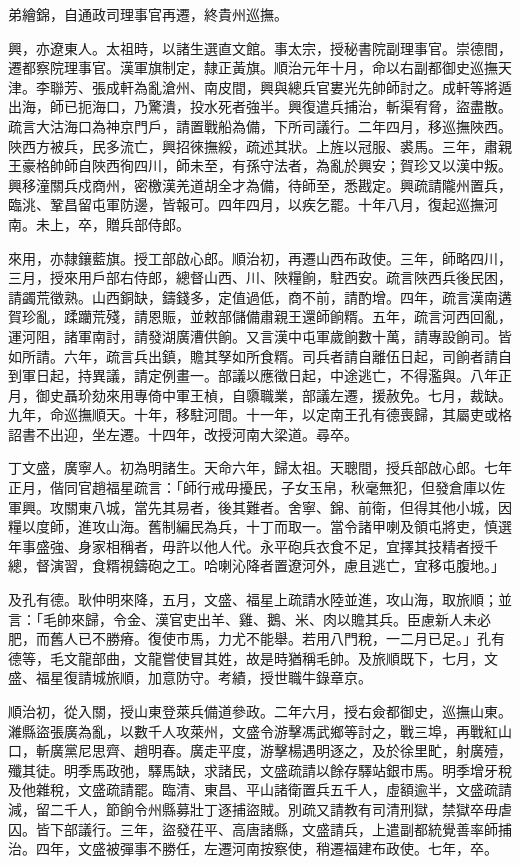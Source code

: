 \begin{pinyinscope}
弟繪錦，自通政司理事官再遷，終貴州巡撫。

興，亦遼東人。太祖時，以諸生選直文館。事太宗，授秘書院副理事官。崇德間，遷都察院理事官。漢軍旗制定，隸正黃旗。順治元年十月，命以右副都御史巡撫天津。李聯芳、張成軒為亂滄州、南皮間，興與總兵官婁光先帥師討之。成軒等將遁出海，師已扼海口，乃驚潰，投水死者強半。興復遣兵捕治，斬渠宥脅，盜盡散。疏言大沽海口為神京門戶，請置戰船為備，下所司議行。二年四月，移巡撫陜西。陜西方被兵，民多流亡，興招徠撫綏，疏述其狀。上旌以冠服、裘馬。三年，肅親王豪格帥師自陜西徇四川，師未至，有孫守法者，為亂於興安；賀珍又以漢中叛。興移潼關兵戍商州，密檄漢羌道胡全才為備，待師至，悉戡定。興疏請隴州置兵，臨洮、鞏昌留屯軍防邊，皆報可。四年四月，以疾乞罷。十年八月，復起巡撫河南。未上，卒，贈兵部侍郎。

來用，亦隸鑲藍旗。授工部啟心郎。順治初，再遷山西布政使。三年，師略四川，三月，授來用戶部右侍郎，總督山西、川、陜糧餉，駐西安。疏言陜西兵後民困，請蠲荒徵熟。山西銅缺，鑄錢多，定值過低，商不前，請酌增。四年，疏言漢南遘賀珍亂，蹂躪荒殘，請恩賑，並敕部儲備肅親王還師餉糈。五年，疏言河西回亂，運河阻，諸軍南討，請發湖廣漕供餉。又言漢中屯軍歲餉數十萬，請專設餉司。皆如所請。六年，疏言兵出鎮，贍其孥如所食糈。司兵者請自離伍日起，司餉者請自到軍日起，持異議，請定例畫一。部議以應徵日起，中途逃亡，不得濫與。八年正月，御史聶玠劾來用專倚中軍王楨，自隳職業，部議左遷，援赦免。七月，裁缺。九年，命巡撫順天。十年，移駐河間。十一年，以定南王孔有德喪歸，其屬吏或格詔書不出迎，坐左遷。十四年，改授河南大梁道。尋卒。

丁文盛，廣寧人。初為明諸生。天命六年，歸太祖。天聰間，授兵部啟心郎。七年正月，偕同官趙福星疏言：「師行戒毋擾民，子女玉帛，秋毫無犯，但發倉庫以佐軍興。攻關東八城，當先其易者，後其難者。舍寧、錦、前衛，但得其他小城，因糧以度師，進攻山海。舊制編民為兵，十丁而取一。當令諸甲喇及領屯將吏，慎選年事盛強、身家相稱者，毋許以他人代。永平砲兵衣食不足，宜擇其技精者授千總，督演習，食糈視鑄砲之工。哈喇沁降者置遼河外，慮且逃亡，宜移屯腹地。」

及孔有德。耿仲明來降，五月，文盛、福星上疏請水陸並進，攻山海，取旅順；並言：「毛帥來歸，令金、漢官吏出羊、雞、鵝、米、肉以贍其兵。臣慮新人未必肥，而舊人已不勝瘠。復使市馬，力尤不能舉。若用八門稅，一二月已足。」孔有德等，毛文龍部曲，文龍嘗使冒其姓，故是時猶稱毛帥。及旅順既下，七月，文盛、福星復請城旅順，加意防守。考績，授世職牛錄章京。

順治初，從入關，授山東登萊兵備道參政。二年六月，授右僉都御史，巡撫山東。濰縣盜張廣為亂，以數千人攻萊州，文盛令游擊馮武鄉等討之，戰三埠，再戰紅山口，斬廣黨尼思齊、趙明春。廣走平度，游擊楊遇明逐之，及於徐里甿，射廣殪，殲其徒。明季馬政弛，驛馬缺，求諸民，文盛疏請以餘存驛站銀市馬。明季增牙稅及他雜稅，文盛疏請罷。臨清、東昌、平山諸衛置兵五千人，虛額逾半，文盛疏請減，留二千人，節餉令州縣募壯丁逐捕盜賊。別疏又請教有司清刑獄，禁獄卒毋虐囚。皆下部議行。三年，盜發茌平、高唐諸縣，文盛請兵，上遣副都統覺善率師捕治。四年，文盛被彈事不勝任，左遷河南按察使，稍遷福建布政使。七年，卒。


\end{pinyinscope}
